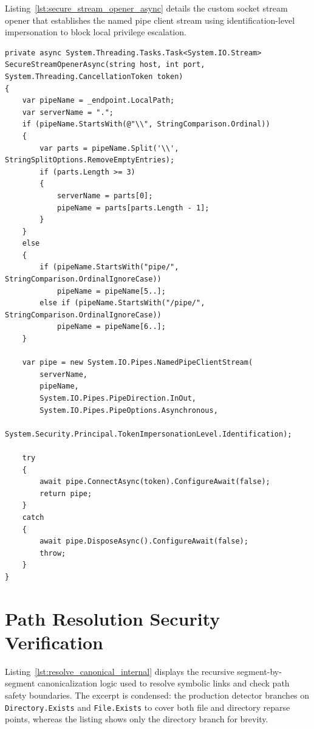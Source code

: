Listing~\ref{lst:secure_stream_opener_async} details the custom socket stream opener that establishes the named pipe client stream using identification-level impersonation to block local privilege escalation.

\begin{lstlisting}[language=CSharp, caption={Custom SecureStreamOpenerAsync with Identification Impersonation}, label={lst:secure_stream_opener_async}]
private async System.Threading.Tasks.Task<System.IO.Stream> SecureStreamOpenerAsync(string host, int port, System.Threading.CancellationToken token)
{
    var pipeName = _endpoint.LocalPath;
    var serverName = ".";
    if (pipeName.StartsWith(@"\\", StringComparison.Ordinal))
    {
        var parts = pipeName.Split('\\', StringSplitOptions.RemoveEmptyEntries);
        if (parts.Length >= 3)
        {
            serverName = parts[0];
            pipeName = parts[parts.Length - 1];
        }
    }
    else
    {
        if (pipeName.StartsWith("pipe/", StringComparison.OrdinalIgnoreCase))
            pipeName = pipeName[5..];
        else if (pipeName.StartsWith("/pipe/", StringComparison.OrdinalIgnoreCase))
            pipeName = pipeName[6..];
    }

    var pipe = new System.IO.Pipes.NamedPipeClientStream(
        serverName,
        pipeName,
        System.IO.Pipes.PipeDirection.InOut,
        System.IO.Pipes.PipeOptions.Asynchronous,
        System.Security.Principal.TokenImpersonationLevel.Identification);

    try
    {
        await pipe.ConnectAsync(token).ConfigureAwait(false);
        return pipe;
    }
    catch
    {
        await pipe.DisposeAsync().ConfigureAwait(false);
        throw;
    }
}
\end{lstlisting}

\section{Path Resolution Security Verification}
Listing~\ref{lst:resolve_canonical_internal} displays the recursive segment-by-segment canonicalization logic used to resolve symbolic links and check path safety boundaries. The excerpt is condensed: the production detector branches on \texttt{Directory.Exists} and \texttt{File.Exists} to cover both file and directory reparse points, whereas the listing shows only the directory branch for brevity.


